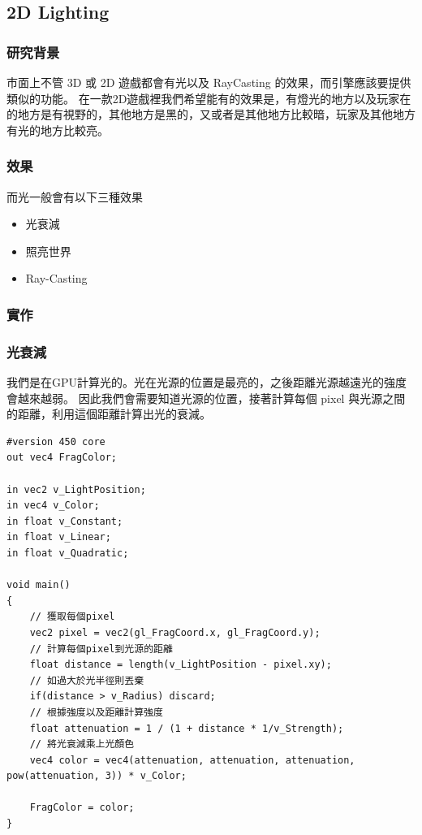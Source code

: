 \subsection{2D Lighting}
\label{sub:2D Lighting}
\subsubsection{研究背景}

市面上不管 3D 或 2D 遊戲都會有光以及 RayCasting 的效果，而引擎應該要提供類似的功能。
在一款2D遊戲裡我們希望能有的效果是，有燈光的地方以及玩家在的地方是有視野的，其他地方是黑的，又或者是其他地方比較暗，玩家及其他地方有光的地方比較亮。

\subsubsection{效果}

而光一般會有以下三種效果

\begin{itemize}
\item{光衰減}
\item{照亮世界}
\item{Ray-Casting}
\end{itemize}

\subsubsection{實作}

\subsubsection{光衰減}
我們是在GPU計算光的。光在光源的位置是最亮的，之後距離光源越遠光的強度會越來越弱。
因此我們會需要知道光源的位置，接著計算每個 pixel 與光源之間的距離，利用這個距離計算出光的衰減。

\begin{lstlisting}
#version 450 core
out vec4 FragColor;

in vec2 v_LightPosition;
in vec4 v_Color;
in float v_Constant;
in float v_Linear;
in float v_Quadratic;

void main()
{
    // 獲取每個pixel
    vec2 pixel = vec2(gl_FragCoord.x, gl_FragCoord.y);
    // 計算每個pixel到光源的距離
    float distance = length(v_LightPosition - pixel.xy);
    // 如過大於光半徑則丟棄
    if(distance > v_Radius) discard;
    // 根據強度以及距離計算強度
    float attenuation = 1 / (1 + distance * 1/v_Strength);
    // 將光衰減乘上光顏色
    vec4 color = vec4(attenuation, attenuation, attenuation, pow(attenuation, 3)) * v_Color;

    FragColor = color;
}
\end{lstlisting}

